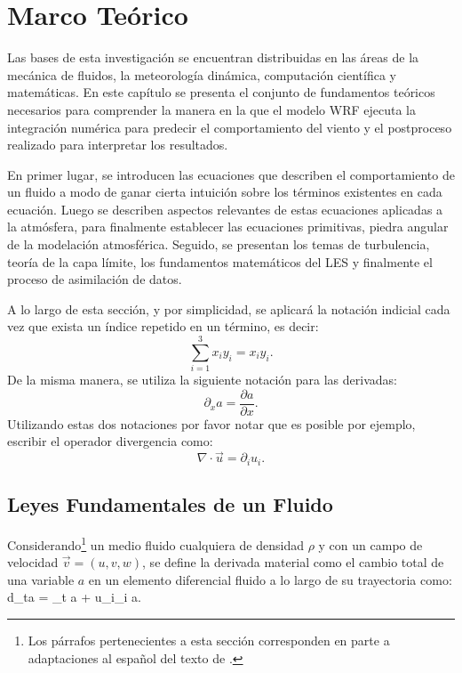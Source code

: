 \chapter{Marco Teórico}
Las bases de esta investigación se encuentran distribuidas en las áreas de la mecánica de fluidos, la meteorología dinámica, computación científica y matemáticas. En este capítulo se presenta el conjunto de fundamentos teóricos necesarios para comprender la manera en la que el modelo WRF ejecuta la integración numérica para predecir el comportamiento del viento y el postproceso realizado para interpretar los resultados. 

En primer lugar, se introducen las ecuaciones que describen el comportamiento de un fluido a modo de ganar cierta intuición sobre los términos existentes en cada ecuación. Luego se describen aspectos relevantes de estas ecuaciones aplicadas a la atmósfera, para finalmente establecer las ecuaciones primitivas, piedra angular de la modelación atmosférica. Seguido, se presentan los temas de turbulencia, teoría de la capa límite, los fundamentos matemáticos del LES y finalmente el proceso de asimilación de datos.

A lo largo de esta sección, y por simplicidad, se aplicará la notación indicial cada vez que exista un índice repetido en un término, es decir:
\begin{equation}\label{eq:indicial}
\sum_{i=1}^{3}\! x_i y_i = x_i y_i.
\end{equation}
De la misma manera, se utiliza la siguiente notación para las derivadas:
\begin{equation}
\partial_x a = \frac{\partial a}{\partial x}.
\end{equation}
Utilizando estas dos notaciones por favor notar que es posible por ejemplo, escribir el operador divergencia como:
\begin{equation}\label{eq:divergencia}
\nabla\cdot\vec{u} = \partial_i u_i.
\end{equation}
\section{Leyes Fundamentales de un Fluido}
Considerando\footnote{Los párrafos pertenecientes a esta sección corresponden en parte a adaptaciones al español del texto de \cite{kundu2001fluid}.} un medio fluido cualquiera de densidad $\rho$ y con un campo de velocidad $\vec{v}=(u,v,w)$, se define la derivada material como el cambio total de una variable $a$ en un elemento diferencial fluido a lo largo de su trayectoria como:
\be 
d_ta = \partial_t a + u_i\partial_i a.
\ee

